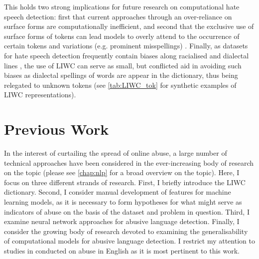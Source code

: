 This holds two strong implications for future research on computational hate speech detection: first that current approaches through an over-reliance on surface forms are computationally inefficient, and second that the exclusive use of surface forms of tokens can lead models to overly attend to the occurrence of certain tokens and variations (e.g. prominent misspellings) \citep{Rottger:2021}.  
Finally, as datasets for hate speech detection frequently contain biases along racialised and dialectal lines \citep{Waseem:2018,Davidson:2019}, the use of LIWC can serve as small, but conflicted aid in avoiding such biases as dialectal spellings of words are  appear in the dictionary, thus being relegated to unknown tokens (see \cref{tab:LIWC_tok} for synthetic examples of LIWC representations).  
  
\section{Previous Work}  
In the interest of curtailing the spread of online abuse, a large number of technical approaches have been considered in the ever-increasing body of research on the topic (please see \cref{chap:nlp} for a broad overview on the topic).  
Here, I focus on three different strands of research.  
First, I briefly introduce the LIWC dictionary.   
Second, I consider manual development of features for machine learning models, as it is necessary to form hypotheses for what might serve as indicators of abuse on the basis of the dataset and problem in question.  
Third, I examine neural network approaches for abusive language detection.  
Finally, I consider the growing body of research devoted to examining the generalisability of computational models for abusive language detection.  
I restrict my attention to studies in conducted on abuse in English as it is most pertinent to this work.  
  
